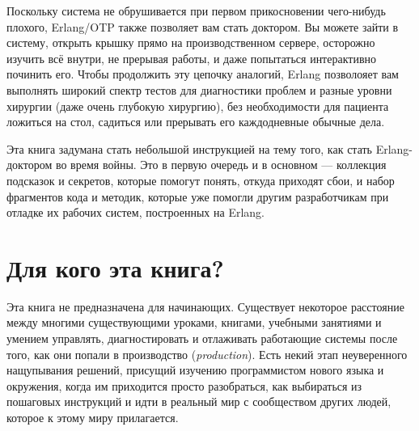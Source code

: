 Поскольку система не обрушивается при первом прикосновении чего-нибудь плохого, Erlang/OTP также позволяет вам стать доктором. Вы можете зайти в систему, открыть крышку прямо на производственном сервере, осторожно изучить всё внутри, не прерывая работы, и даже попытаться интерактивно починить его. Чтобы продолжить эту цепочку аналогий, Erlang позволояет вам выполнять широкий спектр тестов для диагностики проблем и разные уровни хирургии (даже очень глубокую хирургию), без необходимости для пациента ложиться на стол, садиться или прерывать его каждодневные обычные дела.

Эта книга задумана стать небольшой инструкцией на тему того, как стать Erlang-доктором во время войны. Это в первую очередь и в основном --- коллекция подсказок и секретов, которые помогут понять, откуда приходят сбои, и набор фрагментов кода и методик, которые уже помогли другим разработчикам при отладке их рабочих систем, построенных на Erlang.



\section*{Для кого эта книга?}
\label{sec:who-is-this-for}

Эта книга не предназначена для начинающих. Существует некоторое расстояние между многими существующими уроками, книгами, учебными занятиями и умением управлять, диагностировать и отлаживать работающие системы после того, как они попали в производство (\emph{production}). Есть некий этап неуверенного нащупывания решений, присущий изучению программистом нового языка и окружения, когда им приходится просто разобраться, как выбираться из пошаговых инструкций и идти в реальный мир с сообществом других людей, которое к этому миру прилагается.


